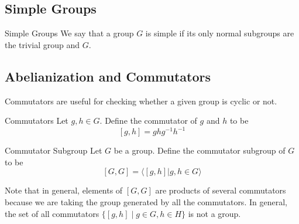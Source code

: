 \documentclass[a4paper]{article}
\begin{document}
\subsection{Simple Groups}
\begin{defn}{Simple Groups}{} We say that a group $G$ is simple if its only normal subgroups are the trivial group and $G$. 
\end{defn}

\subsection{Abelianization and Commutators}
Commutators are useful for checking whether a given group is cyclic or not. 

\begin{defn}{Commutators}{} Let $g,h\in G$. Define the commutator of $g$ and $h$ to be $$[g,h]=ghg^{-1}h^{-1}$$
\end{defn}

\begin{defn}{Commutator Subgroup}{} Let $G$ be a group. Define the commutator subgroup of $G$ to be $$[G,G]=\langle [g,h]|g,h\in G\rangle$$
\end{defn}

Note that in general, elements of $[G,G]$ are products of several commutators because we are taking the group generated by all the commutators. In general, the set of all commutators $\{[g,h]\;|\;g\in G, h\in H\}$ is not a group. 
\end{document}
